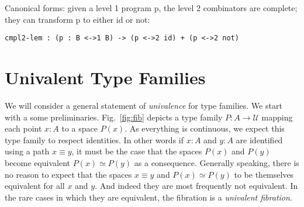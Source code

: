 \documentclass{entcs}
\begin{document}
Canonical forms: given a level 1 program p, the level 2 combinators are
complete; they can transform p to either id or not:
\begin{verbatim}
cmpl2-lem : (p : B <->1 B) -> (p <->2 id) + (p <->2 not)
\end{verbatim}

\section{Univalent Type Families}

We will consider a general statement of \emph{univalence} for type families. We
start with a some preliminaries. Fig.~\ref{fig:fib} depicts a type family
$P : A \rightarrow \mathcal{U}$ mapping each point $x : A$ to a space $P(x)$. As
everything is continuous, we expect this type family to respect identities. In
other words if $x:A$ and $y:A$ are identified using a path $x \equiv y$, it must
be the case that the spaces $P(x)$ and $P(y)$ become equivalent
$P(x) \simeq P(y)$ as a consequence. Generally speaking, there is no reason to
expect that the spaces $x \equiv y$ and $P(x) \simeq P(y)$ to be themselves
equivalent for all $x$ and $y$. And indeed they are most frequently not
equivalent. In the rare cases in which they are equivalent, the fibration is a
\emph{univalent fibration}.
\end{document}
